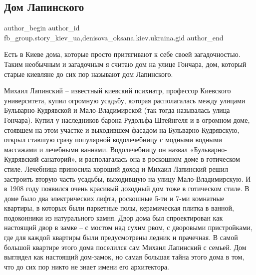  
 
 
 
 
 
\subsection{Дом Лапинского}
\label{sec:06_09_2021.fb.fb_group.story_kiev_ua.1.dom_lapinskogo}
 
\ifcmt
 author_begin
   author_id fb_group.story_kiev_ua,denisova_oksana.kiev.ukraina.gid
 author_end
\fi

Есть в Киеве дома, которые просто притягивают к себе своей загадочностью. Таким
необычным и загадочным я считаю дом на улице Гончара, дом, который старые
киевляне до сих пор называют дом Лапинского.


Михаил Лапинский – известный киевский психиатр, профессор Киевского
университета, купил огромную усадьбу, которая располагалась между улицами
Бульварно\hyp Кудрявской и Мало\hyp Владимирской (так тогда называлась улица Гончара).
Купил у наследников барона Рудольфа Штейнгеля и в огромном доме, стоявшем на
этом участке и выходившем фасадом на Бульварно\hyp Кудрявскую, открыл ставшую сразу
популярной водолечебницу с модными водными массажами и лечебными ваннами.
Водолечебницу он назвал «Бульварно\hyp Кудрявский санаторий»,  и располагалась она
в роскошном доме в готическом стиле. Лечебница приносила хороший доход и
Михаил Лапинский решил застроить вторую часть усадьбы, выходившую на улицу
Мало\hyp Владимирскую. И в 1908 году появился очень красивый доходный дом тоже в
готическом стиле. В доме  было два электрических лифта, роскошные 5-ти и 7-ми
комнатные квартиры, в которых были  паркетные полы, керамическая плитка в
ванной, подоконники из натурального камня. Двор дома был спроектирован как
настоящий двор в замке – с мостом над сухим рвом, с дворовыми пристройками, где
для каждой квартиры были предусмотрены ледник и прачечная. В самой большой
квартире этого дома поселился сам Михаил Лапинский с семьей. Дом выглядел как
настоящий дом\hyp замок, но самая большая тайна этого дома в том, что до сих пор
никто не знает имени его архитектора.

